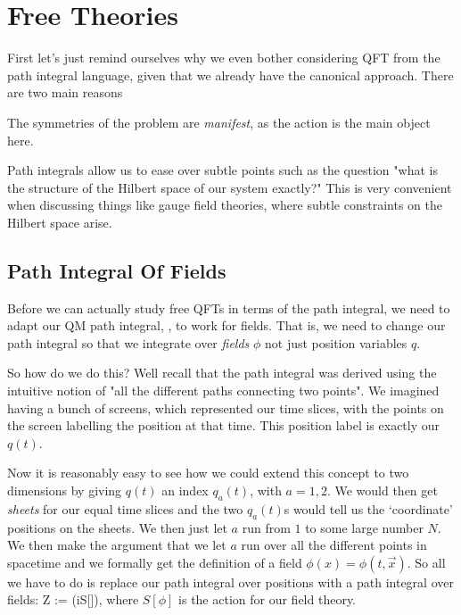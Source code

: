 \chapter{Free Theories}

First let's just remind ourselves why we even bother considering QFT from the path integral language, given that we already have the canonical approach. There are two main reasons 
\ben[label=(\roman*)]
    \item The symmetries of the problem are \textit{manifest}, as the action is the main object here. 
    \item Path integrals allow us to ease over subtle points such as the question "what is the structure of the Hilbert space of our system exactly?" This is very convenient when discussing things like gauge field theories, where subtle constraints on the Hilbert space arise.
\een 

\section{Path Integral Of Fields}

Before we can actually study free QFTs in terms of the path integral, we need to adapt our QM path integral, , to work for fields. That is, we need to change our path integral so that we integrate over \textit{fields} $\phi$ not just position variables $q$. 

So how do we do this? Well recall that the path integral was derived using the intuitive notion of "all the different paths connecting two points". We imagined having a bunch of screens, which represented our time slices, with the points on the screen labelling the position at that time. This position label is exactly our $q(t)$. 

Now it is reasonably easy to see how we could extend this concept to two dimensions by giving $q(t)$ an index $q_a(t)$, with $a=1,2$. We would then get \textit{sheets} for our equal time slices and the two $q_a(t)$s would tell us the `coordinate' positions on the sheets. We then just let $a$ run from $1$ to some large number $N$. We then make the argument that we let $a$ run over all the different points in spacetime and we formally get the definition of a field $\phi(x)=\phi(t,\Vec{x})$. So all we have to do is replace our path integral over positions with a path integral over fields:
\bse
    Z := \int [\pD\phi] \exp\big(iS[\phi]\big),
\ese
where $S[\phi]$ is the action for our field theory. 

